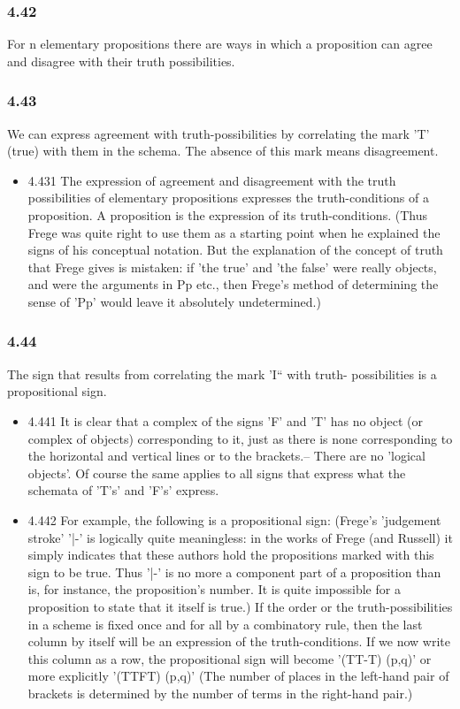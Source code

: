 \documentclass[11pt]{article}
\begin{document}
\subsubsection*{4.42}
\label{sec:org3083ed4}
For n elementary propositions there are ways in which a proposition
can agree and disagree with their truth possibilities.
\subsubsection*{4.43}
\label{sec:org2ea98d3}
We can express agreement with truth-possibilities by correlating the
mark 'T' (true) with them in the schema. The absence of this mark means
disagreement.
\begin{itemize}
\item 4.431
\label{sec:orgb5ca169}
The expression of agreement and disagreement with the truth
possibilities of elementary propositions expresses the truth-conditions of
a proposition. A proposition is the expression of its truth-conditions.
(Thus Frege was quite right to use them as a starting point when he
explained the signs of his conceptual notation. But the explanation of the
concept of truth that Frege gives is mistaken: if 'the true' and 'the
false' were really objects, and were the arguments in Pp etc., then Frege's
method of determining the sense of 'Pp' would leave it absolutely
undetermined.)
\end{itemize}
\subsubsection*{4.44}
\label{sec:orgcc7878b}
The sign that results from correlating the mark 'I`` with truth-
possibilities is a propositional sign.
\begin{itemize}
\item 4.441
\label{sec:orgab9ad49}
It is clear that a complex of the signs 'F' and 'T' has no object (or
complex of objects) corresponding to it, just as there is none
corresponding to the horizontal and vertical lines or to the brackets.--
There are no 'logical objects'. Of course the same applies to all signs
that express what the schemata of 'T's' and 'F's' express.
\item 4.442
\label{sec:org6d82501}
For example, the following is a propositional sign: (Frege's
'judgement stroke' '|-' is logically quite meaningless: in the works of
Frege (and Russell) it simply indicates that these authors hold the
propositions marked with this sign to be true. Thus '|-' is no more a
component part of a proposition than is, for instance, the proposition's
number. It is quite impossible for a proposition to state that it itself is
true.) If the order or the truth-possibilities in a scheme is fixed once
and for all by a combinatory rule, then the last column by itself will be
an expression of the truth-conditions. If we now write this column as a
row, the propositional sign will become '(TT-T) (p,q)' or more explicitly
'(TTFT) (p,q)' (The number of places in the left-hand pair of brackets is
determined by the number of terms in the right-hand pair.)
\end{itemize}
\end{document}
